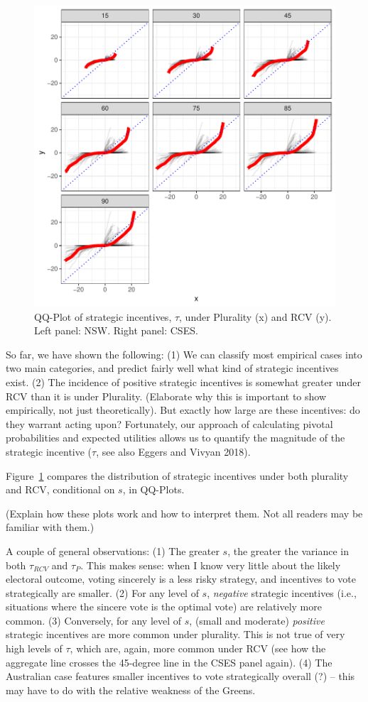 \documentclass[11pt, letter]{article}
\begin{document}
\begin{figure}[!h]
	\centering
	\includegraphics[width = .6 \textwidth]{"../output/figures/cses_qq"}
	\caption{QQ-Plot of strategic incentives, $\tau$, under Plurality (x) and RCV (y). Left panel: NSW. Right panel: CSES.}
	\label{fig:qqplots}
\end{figure}

So far, we have shown the following: (1) We can classify most empirical cases into two main categories, and predict fairly well what kind of strategic incentives exist. (2) The incidence of positive strategic incentives is somewhat greater under RCV than it is under Plurality. (Elaborate why this is important to show empirically, not just theoretically). But exactly how large are these incentives: do they warrant acting upon? Fortunately, our approach of calculating pivotal probabilities and expected utilities allows us to quantify the magnitude of the strategic incentive ($\tau$, see also Eggers and Vivyan 2018). 

Figure~\ref{fig:qqplots} compares the distribution of strategic incentives under both plurality and RCV, conditional on $s$, in QQ-Plots. 

(Explain how these plots work and how to interpret them. Not all readers may be familiar with them.)

A couple of general observations: (1) The greater $s$, the greater the variance in both $\tau_{RCV}$ and  $\tau_{P}$. This makes sense: when I know very little about the likely electoral outcome, voting sincerely is a less risky strategy, and incentives to vote strategically are smaller. (2) For any level of $s$, \textit{negative} strategic incentives (i.e., situations where the sincere vote is the optimal vote) are relatively more common. (3) Conversely, for any level of $s$, (small and moderate) \textit{positive} strategic incentives are more common under plurality. This is not true of very high levels of $\tau$, which are, again, more common under RCV (see how the aggregate line crosses the 45-degree line in the CSES panel again). (4) The Australian case features smaller incentives to vote strategically overall (?) -- this may have to do with the relative weakness of the Greens. 
\end{document}

